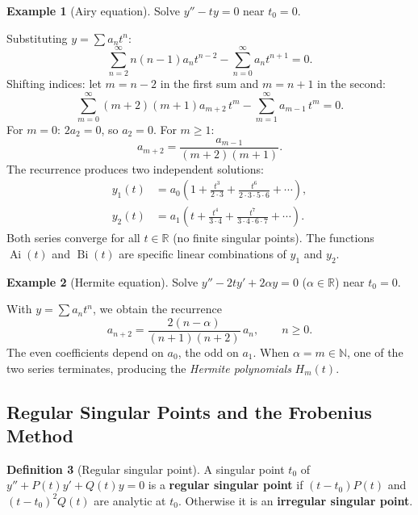 \documentclass[12pt,a4paper,openany]{book}
\theoremstyle{definition}
\newtheorem{definition}{Definition}[chapter]
\newtheorem{example}[definition]{Example}
\theoremstyle{plain}
\theoremstyle{remark}
\newcommand{\R}{\mathbb{R}}
\newcommand{\N}{\mathbb{N}}
\begin{document}
\begin{example}[Airy equation]\label{ex:airy}
Solve $y'' - ty = 0$ near $t_0=0$.

Substituting $y=\sum a_n t^n$:
\[
  \sum_{n=2}^{\infty}n(n-1)a_n t^{n-2} - \sum_{n=0}^{\infty}a_n t^{n+1}=0.
\]
Shifting indices: let $m=n-2$ in the first sum and $m=n+1$ in the second:
\[
  \sum_{m=0}^{\infty}(m+2)(m+1)a_{m+2}\,t^m
  - \sum_{m=1}^{\infty}a_{m-1}\,t^m = 0.
\]
For $m=0$: $2a_2=0$, so $a_2=0$.  For $m\ge 1$:
\begin{equation}\label{eq:airy-recurrence}
  a_{m+2} = \frac{a_{m-1}}{(m+2)(m+1)}.
\end{equation}
The recurrence produces two independent solutions:
\begin{align*}
  y_1(t) &= a_0\!\left(1+\frac{t^3}{2\cdot 3}
    +\frac{t^6}{2\cdot 3\cdot 5\cdot 6}+\cdots\right), \\
  y_2(t) &= a_1\!\left(t+\frac{t^4}{3\cdot 4}
    +\frac{t^7}{3\cdot 4\cdot 6\cdot 7}+\cdots\right).
\end{align*}
Both series converge for all $t\in\R$ (no finite singular points).
The functions $\operatorname{Ai}(t)$ and $\operatorname{Bi}(t)$ are
specific linear combinations of $y_1$ and $y_2$.
\end{example}

\begin{example}[Hermite equation]\label{ex:hermite}
Solve $y''-2ty'+2\alpha y=0$ ($\alpha\in\R$) near $t_0=0$.

With $y=\sum a_n t^n$, we obtain the recurrence
\[
  a_{n+2} = \frac{2(n-\alpha)}{(n+1)(n+2)}\,a_n, \qquad n\ge 0.
\]
The even coefficients depend on $a_0$, the odd on $a_1$.
When $\alpha=m\in\N$, one of the two series terminates, producing
the \emph{Hermite polynomials} $H_m(t)$.
\end{example}

\subsection{Regular Singular Points and the Frobenius Method}
\label{subsec:frobenius}

\begin{definition}[Regular singular point]\label{def:regular-singular}
A singular point $t_0$ of $y''+P(t)y'+Q(t)y=0$ is a
\textbf{regular singular point} if $(t-t_0)P(t)$ and
$(t-t_0)^2Q(t)$ are analytic at $t_0$.  Otherwise it is an
\textbf{irregular singular point}.
\end{definition}
\end{document}
